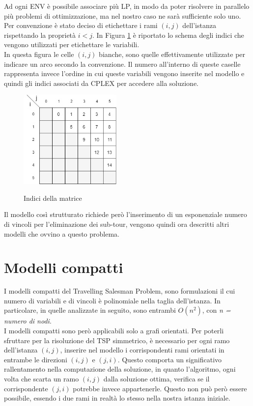 Ad ogni ENV è possibile associare più LP, in modo da poter risolvere in parallelo più problemi di ottimizzazione, ma nel nostro caso ne sarà sufficiente solo uno.\\
Per convenzione è stato deciso di etichettare i rami $(i,j)$ dell'istanza rispettando la proprietà $i<j$. In Figura \ref{Indici_matrice} è riportato lo schema degli indici che vengono utilizzati per etichettare le variabili.\\
In questa figura le celle $(i,j)$ bianche, sono quelle effettivamente utilizzate per indicare un arco secondo la convenzione. Il numero all'interno di queste caselle rappresenta invece l'ordine in cui queste variabili vengono inserite nel modello e quindi gli indici associati da CPLEX per accedere alla soluzione.
\begin{figure}[h] 
\begin{center} 
  \includegraphics[width=5cm]{Images/indices_matrix}\\ 
  \caption{\footnotesize{Indici della matrice}}
  \label{Indici_matrice} 
\end{center} 
\end{figure}
Il modello così strutturato richiede però l'inserimento di un esponenziale numero di vincoli per l'eliminazione dei sub-tour, vengono quindi ora descritti altri modelli che ovvino a questo problema.\\  

\section{Modelli compatti}
I modelli compatti del Travelling Salesman Problem, sono formulazioni il cui numero di variabili e di vincoli è polinomiale nella taglia dell'istanza. In particolare, in quelle analizzate in seguito, sono entrambi $O(n^2)$, con \textit{n = numero di nodi}.\\
I modelli compatti sono però applicabili solo a grafi orientati. Per poterli sfruttare per la risoluzione del TSP simmetrico, è necessario per ogni ramo dell'istanza $(i,j)$, inserire nel modello i corrispondenti rami orientati in entrambe le direzioni $(i,j)$ e $(j,i)$. Questo comporta un significativo rallentamento nella computazione della soluzione, in quanto l'algoritmo, ogni volta che scarta un ramo $(i,j)$ dalla soluzione ottima, verifica se il corrispondente $(j,i)$ potrebbe invece appartenerle. Questo non può però essere possibile, essendo i due rami in realtà lo stesso nella nostra istanza iniziale.\\ 
